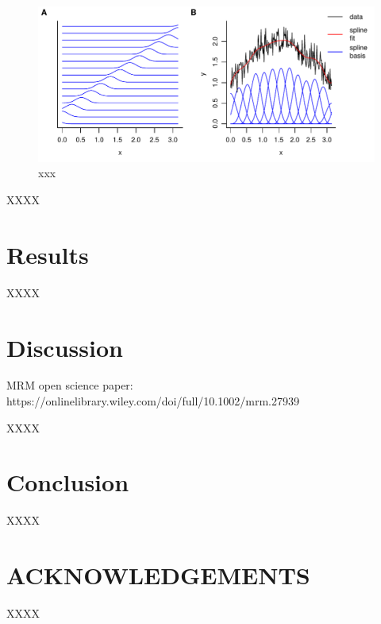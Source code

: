 \documentclass[num-refs]{wiley-article}
\begin{document}

\begin{figure}
  \begin{center}
    \includegraphics[width=1\textwidth]{fig1.pdf}
    \caption{xxx}
    \label{bspline_regression}
  \end{center}
\end{figure}

XXXX

\section{Results}
XXXX

\section{Discussion}
MRM open science paper: https://onlinelibrary.wiley.com/doi/full/10.1002/mrm.27939

XXXX

\section{Conclusion}
XXXX

\section*{ACKNOWLEDGEMENTS}
XXXX



\clearpage
\listoffigures
\end{document}
